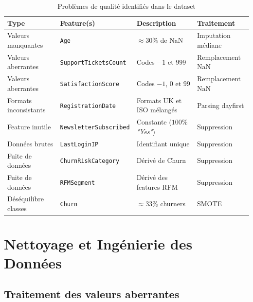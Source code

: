 \documentclass[12pt, a4paper]{article}
\newcommand{\code}[1]{\texttt{\small#1}}
\begin{document}
\begin{table}[H]
\centering
\caption{Problèmes de qualité identifiés dans le dataset}
\renewcommand{\arraystretch}{1.3}
\begin{tabularx}{\textwidth}{l l X l}
\toprule
\rowcolor{primary!90}
\color{white}\textbf{Type} &
\color{white}\textbf{Feature(s)} &
\color{white}\textbf{Description} &
\color{white}\textbf{Traitement} \\
\midrule
Valeurs manquantes  & \code{Age}                  & $\approx30\%$ de NaN               & Imputation médiane \\
\rowcolor{lightgray}
Valeurs aberrantes  & \code{SupportTicketsCount}  & Codes $-1$ et $999$                & Remplacement NaN \\
Valeurs aberrantes  & \code{SatisfactionScore}    & Codes $-1$, $0$ et $99$            & Remplacement NaN \\
\rowcolor{lightgray}
Formats inconsistants & \code{RegistrationDate}   & Formats UK et ISO mélangés         & Parsing dayfirst \\
Feature inutile     & \code{NewsletterSubscribed} & Constante ($100\%$ \textit{"Yes"}) & Suppression \\
\rowcolor{lightgray}
Données brutes      & \code{LastLoginIP}          & Identifiant unique                  & Suppression \\
Fuite de données    & \code{ChurnRiskCategory}    & Dérivé de Churn                    & Suppression \\
\rowcolor{lightgray}
Fuite de données    & \code{RFMSegment}           & Dérivé des features RFM            & Suppression \\
Déséquilibre classes & \code{Churn}               & $\approx33\%$ churners             & SMOTE \\
\bottomrule
\end{tabularx}
\end{table}

\section{Nettoyage et Ingénierie des Données}

\subsection{Traitement des valeurs aberrantes}
\end{document}
